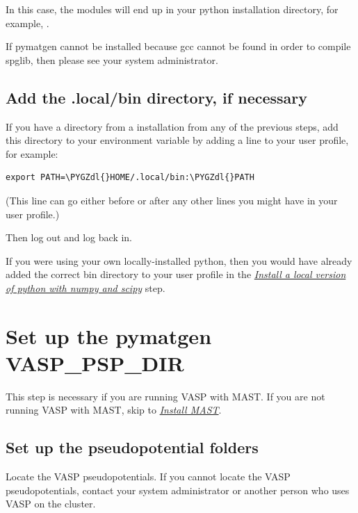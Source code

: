 \documentclass[letterpaper,10pt,english]{sphinxmanual}
\def\PYGZdl{\char`\$}
\begin{document}
In this case, the modules will end up in your python installation directory, for example, .

If pymatgen cannot be installed because gcc cannot be found in order to compile spglib, then please see your system administrator.


\subsection{Add the .local/bin directory, if necessary}
\label{1_0_installation:add-local-bin}\label{1_0_installation:add-the-local-bin-directory-if-necessary}
If you have a  directory from a  installation from any of the previous steps, add this directory to your  environment variable by adding a line to your user profile, for example:

\begin{Verbatim}[commandchars=\\\{\}]
export PATH=\PYGZdl{}HOME/.local/bin:\PYGZdl{}PATH
\end{Verbatim}

(This line can go either before or after any other  lines you might have in your user profile.)

Then log out and log back in.

If you were using your own locally-installed python, then you would have already added the correct bin directory to your user profile in the {\hyperref[1_0_installation:install-local-python]{\emph{Install a local version of python with numpy and scipy}}} step.


\section{Set up the pymatgen VASP\_PSP\_DIR}
\label{1_0_installation:vasp-psp-dir}\label{1_0_installation:set-up-the-pymatgen-vasp-psp-dir}
This step is necessary if you are running VASP with MAST. If you are not running VASP with MAST, skip to {\hyperref[1_0_installation:install-mast]{\emph{Install MAST}}}.


\subsection{Set up the pseudopotential folders}
\label{1_0_installation:set-up-the-pseudopotential-folders}
Locate the VASP pseudopotentials. If you cannot locate the VASP pseudopotentials, contact your system administrator or another person who uses VASP on the cluster.
\end{document}
